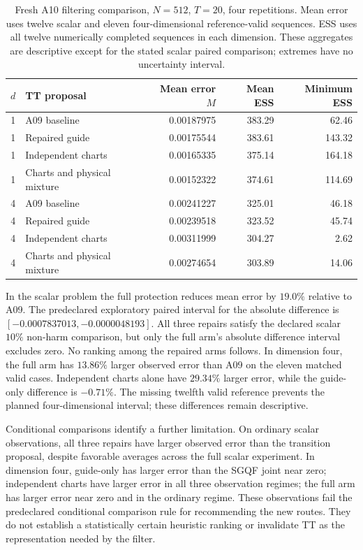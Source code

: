 \documentclass[11pt]{article}
\begin{document}
\begin{table}[htbp]
\centering\small
\begin{tabular}{clrrr}
\toprule
$d$ & TT proposal & Mean error $M$ & Mean ESS & Minimum ESS\\
\midrule
1 & A09 baseline & 0.00187975 & 383.29 & 62.46\\
1 & Repaired guide & 0.00175544 & 383.61 & 143.32\\
1 & Independent charts & 0.00165335 & 375.14 & 164.18\\
1 & Charts and physical mixture & 0.00152322 & 374.61 & 114.69\\
\midrule
4 & A09 baseline & 0.00241227 & 325.01 & 46.18\\
4 & Repaired guide & 0.00239518 & 323.52 & 45.74\\
4 & Independent charts & 0.00311999 & 304.27 & 2.62\\
4 & Charts and physical mixture & 0.00274654 & 303.89 & 14.06\\
\bottomrule
\end{tabular}
\caption{Fresh A10 filtering comparison, $N=512$, $T=20$, four repetitions.
Mean error uses twelve scalar and eleven four-dimensional reference-valid
sequences. ESS uses all twelve numerically completed sequences in each
dimension. These aggregates are descriptive except for the stated scalar
paired comparison; extremes have no uncertainty interval.}
\label{tab:robust-fresh-filtering}
\end{table}

In the scalar problem the full protection reduces mean error by $19.0\%$
relative to A09. The predeclared exploratory paired interval for the absolute
difference is $[-0.0007837013,-0.0000048193]$. All three repairs satisfy the
declared scalar $10\%$ non-harm comparison, but only the full arm's absolute
difference interval excludes zero. No ranking among the repaired arms follows.
In dimension four, the full arm has $13.86\%$ larger observed error than A09
on the eleven matched valid cases. Independent charts alone have $29.34\%$
larger error, while the guide-only difference is $-0.71\%$. The missing
twelfth valid reference prevents the planned four-dimensional interval;
these differences remain descriptive.

Conditional comparisons identify a further limitation. On ordinary scalar
observations, all three repairs have larger observed error than the transition
proposal, despite favorable averages across the full scalar experiment. In
dimension four, guide-only has larger error than the SGQF joint near zero;
independent charts have larger error in all three observation regimes; the
full arm has larger error near zero and in the ordinary regime. These
observations fail the predeclared conditional comparison rule for recommending
the new routes. They do not establish a statistically certain heuristic
ranking or invalidate TT as the representation needed by the filter.
\end{document}
